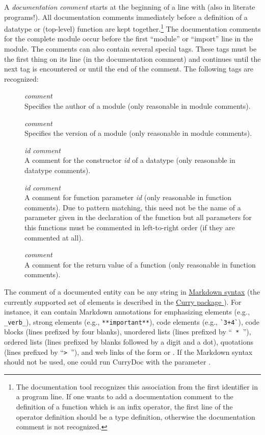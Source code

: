 A \emph{documentation comment}%
starts at the beginning of a line
with \ccode{--- }\pindex{---} (also in literate programs!).
All documentation comments immediately before a
definition of a datatype or (top-level) function are kept together.\footnote{%
The documentation tool recognizes this association from the first identifier
in a program line. If one wants to add a documentation comment
to the definition of a function which is an infix operator,
the first line of the operator definition should be a type definition,
otherwise the documentation comment is not recognized.}
The documentation comments for the complete module occur before
the first ``module'' or ``import'' line in the module.
The comments can also contain several special tags. These tags
must be the first thing on its line (in the documentation comment)
and continues until the next tag is encountered or until the
end of the comment. The following tags are recognized:
\begin{description}
\item[] \emph{comment}\\
Specifies the author of a module (only reasonable in module comments).
\item[] \emph{comment}\\
Specifies the version of a module (only reasonable in module comments).
\item[] \emph{id} \emph{comment}\\
A comment for the constructor \emph{id} of a datatype
(only reasonable in datatype comments).
\item[] \emph{id} \emph{comment}\\
A comment for function parameter \emph{id}
(only reasonable in function comments).
Due to pattern matching, this need not be the name of a parameter
given in the declaration of the function but all parameters
for this functions must be commented in left-to-right order
(if they are commented at all).
\item[] \emph{comment}\\
A comment for the return value of a function
(only reasonable in function comments).
\end{description}
The comment of a documented entity can be any string in
\href{http://en.wikipedia.org/wiki/Markdown}{Markdown syntax}
(the currently supported set of elements
is described in the
\href{https://www-ps.informatik.uni-kiel.de/~cpm/pkgs/markdown.html}{Curry package }).
For instance, it can contain Markdown annotations for
emphasizing elements (e.g., \verb!_verb_!),
strong elements (e.g., \verb!**important**!),
code elements (e.g., \verb!`3+4`!), code blocks (lines prefixed by four blanks),
unordered lists (lines prefixed by  ``\verb! * !''),
ordered lists (lines prefixed by blanks followed by a digit and a dot),
quotations (lines prefixed by ``\verb!> !''),
and web links of the form 
or .
If the Markdown syntax should not be used, one could run CurryDoc
with the parameter .

